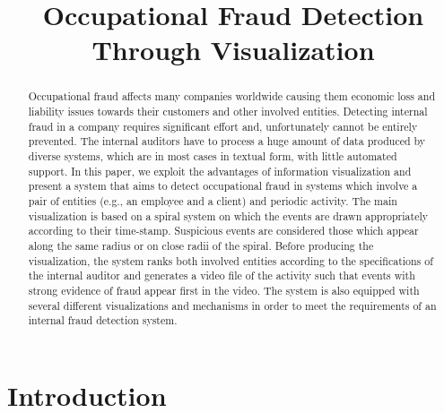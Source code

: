 \documentclass[conference]{IEEEtran}
\begin{document}
\title{Occupational Fraud Detection Through Visualization}


\author{
 }










\maketitle


\begin{abstract}
Occupational fraud affects many companies worldwide causing them
economic loss and liability issues towards their customers and other
involved entities. Detecting internal fraud in a company requires
significant effort and, unfortunately cannot be entirely prevented.
The internal auditors have to process a huge amount of data produced
by diverse systems, which are in most cases in textual form, with
little automated support. In this paper, we exploit the advantages
of information visualization and present a system that aims to
detect occupational fraud in systems which involve a pair of
entities (e.g., an employee and a client) and periodic activity. The
main visualization is based on a spiral system on which the events
are drawn appropriately according to their time-stamp. Suspicious
events are considered those which appear along the same radius or on
close radii of the spiral. Before producing the visualization, the
system ranks both involved entities according to the specifications
of the internal auditor and generates a video file of the activity
such that events with strong evidence of fraud appear first in the
video. The system is also equipped with several different
visualizations and mechanisms in order to meet the requirements of
an internal fraud detection system.
\end{abstract}





\IEEEpeerreviewmaketitle



\section{Introduction}
\label{sec:introduction}
\end{document}
